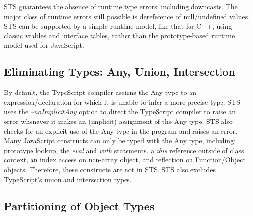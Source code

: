 STS guarantees the absence of runtime type errors, including downcasts.
The major class of runtime errors still possible is dereference of null/undefined values.
STS can be supported by a simple runtime model, like that for C++, using classic vtables and interface tables,
rather than the prototype-based runtime model used for JavaScript.

\subsection{Eliminating Types: Any, Union, Intersection}

By default, the TypeScript compiler assigns the Any type to an expression/declaration for which it is unable to
infer a more precise type. STS uses the \emph{--noImplicitAny} option to direct the TypeScript compiler to raise an error
whenever it makes an (implicit) assignment of the Any type.  STS also checks for an explicit use of the Any type in
the program and raises an error. Many JavaScript constructs can only be typed with the Any type, including: prototype lookup,
the \emph{eval} and \emph{with} statements, a \emph{this} reference outside of class context, an index access on non-array object, and
reflection on Function/Object objects. Therefore, these constructs are not in STS.
STS also excludes TypeScript's union and intersection types.

\subsection{Partitioning of Object Types}

